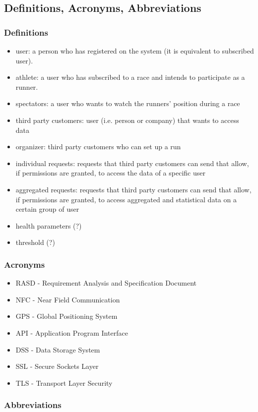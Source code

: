 \subsection{Definitions, Acronyms, Abbreviations}
\subsubsection{Definitions}
\begin{itemize}
\item user: a person who has registered on the system (it is equivalent to subscribed user).
\item athlete: a user who has subscribed to a race and intends to participate as a runner.
\item spectators: a user who wants to watch the runners' position during a race   
\item third party customers: user (i.e. person or company) that wants to access data
\item organizer: third party customers who can set up a run
\item individual requests: requests that third party customers can send that allow, if permissions are granted, to access the data of a specific user
\item aggregated requests: requests that third party customers can send that allow, if permissions are granted, to access aggregated and statistical data on a certain group of user
\item health parameters (?)
\item threshold (?)
\end{itemize}

\subsubsection{Acronyms}
\begin{itemize}
\item RASD - Requirement Analysis and Specification Document
\item NFC - Near Field Communication
\item GPS - Global Positioning System
\item API - Application Program Interface
\item DSS - Data Storage System
\item SSL - Secure Sockets Layer
\item TLS - Transport Layer Security
\end{itemize}

\subsubsection{Abbreviations}
